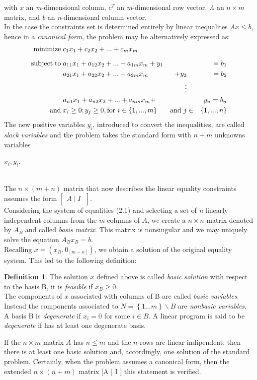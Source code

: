 \documentclass[a4paper,10 pt,titlepage,twoside]{book}
\theoremstyle{plain}
\theoremstyle{definition}
\newtheorem{defn}[thm]{Definition}
\theoremstyle{remark}
\begin{document}
with $x$ an \textit{m}-dimensional column, $c^
{T}$ an \textit{m}-dimensional row vector, \textit{A} an $n \times m$ matrix, and \textit{b} an \textit{n}-dimensional column vector.\\
In the case the constraints set is determined entirely by linear inequalites $Ax \leq b$, hence in a \textit{canonical form}, the problem may be alternatively expressed as:
\begin{alignat*}{3}
\text{minimize\;}&c_1 x_1 + c_2 x_2+ ...+c_m x_m&&&\\[2mm]
\text{subject\;to\;}&a_{11} x_1 +a_{12}x_2 + ... +a_{1m}x_m +y_{1}&&&= b_1\\
		   	&a_{21}x_1+a_{22}x_2+ ... +a_{2m}x_m&+y_{2}&&= b_2\\
&&\;\;\;\vdots&&\\
&a_{n1}x_1+a_{n2}x_2+ ... +a_{nm}x_m+&&&y_{n}=b_n\\
\text{and} \;& x_{i} \geq 0; y_{j} \geq 0, \text{for }i \in\left\lbrace 1,...,m\right\rbrace&\text{and }j&\in&\left\lbrace 1,...,n\right\rbrace
\end{alignat*}
The new positive variables $\mathit{y_{i}}$, introduced to convert the inequalities, are called \textit{slack variables} and the problem takes the standard form with $n+m$ unknowns variables \begin{itshape}$x_{i}, y_{i}.$\end{itshape}\\ The $n\times(m+n)$ matrix that now describes the linear equality constraints assumes the form $\left[\begin{matrix}A\;\vert\; I\;\end{matrix}\right]$.\\
Considering the system of equalities (2.1) and selecting a set of \textit{n} linearly independent columns from the \textit{m} columns of  $A$, we create a $n \times n$ matrix denoted  by $A_{B}$ and called \textit{basis matrix}. This matrix is nonsingular and we may uniquely solve the equation $A_{B}x_{B} = b$. \\
Recalling $x =\left(x_{B},0_{[m-n]}\right)$, we obtain a solution of the original equality system. This led to the following definition:
\begin{defn}
	The solution $x$ defined above is called \textit{basic solution} with respect to the basis B, it is \textit{feasible} if $x_{B}\geq 0$. \\The components of $x$ associated with columns of B are called \textit{basic variables}. Instead the components associated to $N  = \left\lbrace 1...m\right\rbrace  \backslash B$ are \textit{nonbasic variables}.\\
	A basis B is \textit{degenerate} if $x_{i}= 0$ for some $i\in B$.
	A linear program is said to be \textit{degenerate} if has at least one degenerate basis.
\end{defn}
If the $n \times m$ matrix $A$ has $n \leq m$ and the $n$ rows are linear indipendent, then there is at least one basic solution and, accordingly, one solution of the standard problem. Certainly, when the problem assumes a canonical form, then the extended $n \times (n+m)$ matrix [A | I ] this statement is verified.
\end{document}
